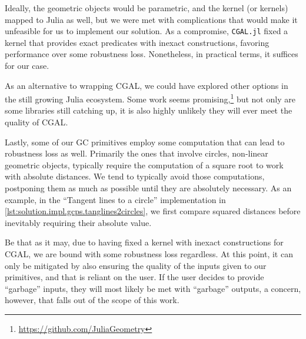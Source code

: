 Ideally, the geometric objects would be parametric, and the kernel (or kernels)
mapped to Julia as well, but we were met with complications that would make it
unfeasible for us to implement our solution.  As a compromise, \texttt{CGAL.jl}
fixed a kernel that provides exact predicates with inexact constructions,
favoring performance over some robustness loss.  Nonetheless, in practical
terms, it suffices for our case.

As an alternative to wrapping \ac{CGAL}, we could have explored other options in
the still growing Julia ecosystem.  Some work seems
promising,\footnote{\url{https://github.com/JuliaGeometry}} but not only are
some libraries still catching up, it is also highly unlikely they will ever meet
the quality of \ac{CGAL}.

Lastly, some of our \ac{GC} primitives employ some computation that can lead to
robustness loss as well.  Primarily the ones that involve circles, non-linear
geometric objects, typically require the computation of a square root to work
with absolute distances.  We tend to typically avoid those computations,
postponing them as much as possible until they are absolutely necessary.  As an
example, in the ``Tangent lines to a circle'' implementation in
\cref{lst:solution.impl.gcps.tanglines2circles}, we first compare squared
distances before inevitably requiring their absolute value.

Be that as it may, due to having fixed a kernel with inexact constructions for
\ac{CGAL}, we are bound with some robustness loss regardless.  At this point, it
can only be mitigated by also ensuring the quality of the inputs given to our
primitives, and that is reliant on the user.  If the user decides to provide
``garbage'' inputs, they will most likely be met with ``garbage'' outputs, a
concern, however, that falls out of the scope of this work.
